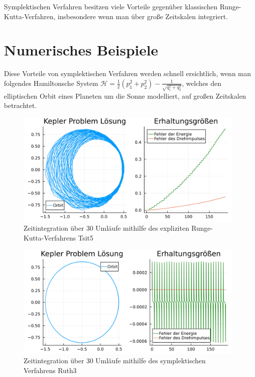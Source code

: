 \documentclass{handout}
\begin{document}
Symplektischen Verfahren besitzen viele Vorteile gegenüber klassischen Runge-Kutta-Verfahren, insbesondere wenn man über große Zeitskalen integriert. \cite{stackexchange} \cite{LectureODE}

\section{Numerisches Beispiele}
Diese Vorteile von symplektischen Verfahren werden schnell ersichtlich, wenn man folgendes Hamiltonsche System $\mathcal{H}=\frac{1}{2}\left(p_1^2+p_2^2\right)-\frac{1}{\sqrt{q_1^2+q_2^2}}$, welches den elliptischen Orbit eines Planeten um die Sonne modelliert, auf großen Zeitskalen betrachtet.

\begin{figure}[H]
    \centering
    \includegraphics[scale = 0.20]{Tsit5.png}
    \caption{Zeitintegration über 30 Umläufe mithilfe des expliziten Runge-Kutta-Verfahrens Tsit5\centering}
    \label{fig:Tsit5}
\end{figure}

\begin{figure}[H]
    \centering
    \includegraphics[scale = 0.20]{symp.png}
    \caption{Zeitintegration über 30 Umläufe mithilfe des symplektischen Verfahrens Ruth3\centering}
    \label{fig:symp}
\end{figure}
\end{document}
